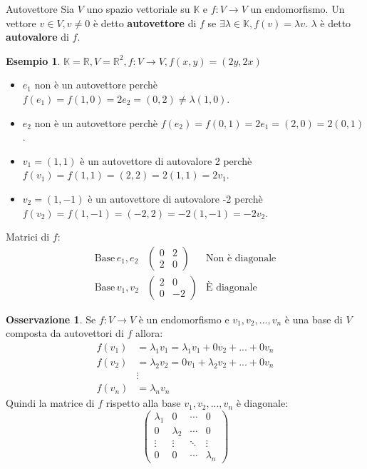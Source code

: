 \documentclass[a4paper]{article}
\theoremstyle{definition}
\newtheorem*{oss}{Osservazione}
\newtheorem*{es}{Esempio}
\begin{document}
	\begin{deff}{Autovettore}{}
		Sia $V$ uno spazio vettoriale su $\mathbb{K}$ e $f: V \to V$ un endomorfismo.
		Un vettore $v \in V, v \ne 0$ è detto \textbf{autovettore} di $f$ se $\exists \lambda \in \mathbb{K}, f(v) = \lambda v$.
		$\lambda$ è detto \textbf{autovalore} di $f$.
	\end{deff}
	\begin{es}
		$\mathbb{K} = \mathbb{R}, V = \mathbb{R}^2, f: V \to V, f(x, y) = (2y, 2x)$
		\begin{itemize}
			\item $e_1$ non è un autovettore perchè $f(e_1) = f(1, 0) = 2e_2 = (0, 2) \ne \lambda (1, 0)$.
			\item $e_2$ non è un autovettore perchè $f(e_2) = f(0, 1) = 2e_1 = (2, 0) = 2(0, 1)$.
			\item $v_1 = (1, 1)$ è un autovettore di autovalore 2 perchè $f(v_1) = f(1, 1) = (2, 2) = 2(1, 1) = 2v_1$.
			\item $v_2 = (1, -1)$ è un autovettore di autovalore -2 perchè $f(v_2) = f(1, -1) = (-2, 2) = -2(1, -1) = -2v_2$.
		\end{itemize}
		Matrici di $f$:
		\begin{align*}
			\text{Base}\, e_1, e_2 & \begin{pmatrix}
				0 & 2 \\
				2 & 0
			\end{pmatrix} & \text{Non è diagonale} \\
			\text{Base}\, v_1, v_2 & \begin{pmatrix}
				2 & 0 \\
				0 & -2
			\end{pmatrix} & \text{È diagonale}
		\end{align*}
	\end{es}
	\begin{oss}
		Se $f: V \to V$ è un endomorfismo e $v_1, v_2, ..., v_n$ è una base di $V$ composta da autovettori di $f$ allora:
		\begin{align*}
			f(v_1) &= \lambda_1 v_1 = \lambda_1 v_1 + 0v_2 + ... + 0v_n \\
			f(v_2) &= \lambda_2 v_2 = 0v_1 + \lambda_2 v_2 + ... + 0v_n \\
			&\vdots \\
			f(v_n) &= \lambda_n v_n
		\end{align*}
		Quindi la matrice di $f$ rispetto alla base $v_1, v_2, ..., v_n$ è diagonale:
		\begin{equation*}
			\begin{pmatrix}
				\lambda_1 & 0 & \cdots & 0 \\
				0 & \lambda_2 & \cdots & 0 \\
				\vdots & \vdots & \ddots & \vdots \\
				0 & 0 & \cdots & \lambda_n
			\end{pmatrix}
		\end{equation*}
	\end{oss}
\end{document}
